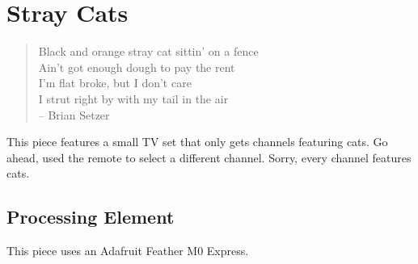 %
%
%
%
% 
%
%
%
%
%
% 
%

\section{Stray Cats}

\begin{quote}
Black and orange stray cat sittin' on a fence\\
Ain't got enough dough to pay the rent\\
I'm flat broke, but I don't care\\
I strut right by with my tail in the air\\
-- Brian Setzer
\end{quote}

This piece features a small TV set that only gets channels featuring cats. Go 
ahead, used the remote to select a different channel.  Sorry, every channel 
features cats.

\subsection*{Processing Element}

This piece uses an Adafruit Feather M0 Express.

